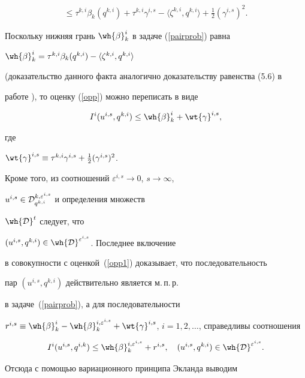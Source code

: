 \begin{pf}
\begin{multline}
%


\le\tau^{k,i}\beta_k(q^{k,i})+\tau^{k,i}\gamma^{i,s}-


\langle\zeta^{k,i},q^{k,i}\rangle+\frac{1}{2}(\gamma^{i,s})^2.


\end{multline}


Поскольку нижняя грань $\wh{\beta}_k^i$ в задаче (\ref{pairprob}) равна


$\wh{\beta}_k^i=\tau^{k,i}\beta_k(q^{k,i})-\langle\zeta^{k,i},q^{k,i}\rangle$


(доказательство данного факта аналогично доказательству равенства (5.6) в


работе \cite{sumin97a}), то оценку (\ref{opp}) можно переписать в виде


\begin{equation}\label{opp1}


I^i(u^{i,s},q^{k,i})\leq\wh{\beta}_k^i+\wt{\gamma}^{i,s},


\end{equation}


где


$\wt{\gamma}^{i,s}\equiv\tau^{k,i}\gamma^{i,s}+\frac{1}{2}(\gamma^{i,s})^2$.


Кроме того, из соотношений $\varepsilon^{i,s}\to0$, $s\to\infty$,


$u^{i,s}\in {\cal D}^{k,\varepsilon^{i,s}}_{q^{k,i}}$ и определения множеств


$\wh{{\cal D}}^t$ следует, что


$(u^{i,s},q^{k,i})\in\wh{{\cal D}}^{\varepsilon^{i,s}}$. Последнее включение


в совокупности с оценкой~(\ref{opp1}) доказывает, что последовательность


пар $(u^{i,s},q^{k,i})$ действительно является м.\,п.\,р.


в задаче~(\ref{pairprob}), а для последовательности


$r^{i,s}\equiv\wh{\beta}_k^i-\wh{\beta}_k^{i,\varepsilon^{i,s}}+


\wt{\gamma}^{i,s}$, $i=1,2,\dotsc$, справедливы соотношения


$$


I^{i}(u^{i,s},q^{i,k})\leq\wh{\beta}_k^{i,\varepsilon^{i,s}}+r^{i,s},  


\quad (u^{i,s},q^{k,i})\in\wh{{\cal D}}^{\varepsilon^{i,s}}.


$$


Отсюда с помощью вариационного принципа Экланда \cite{ekeland} выводим



\end{pf}
